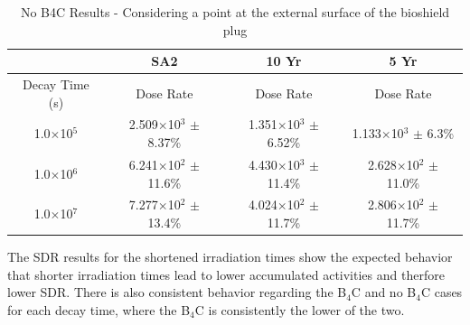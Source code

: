 \documentclass[12pt]{article}
\begin{document}
\begin{table}[ht!]
   \centering      
   \begin{tabular}{| c | c | c | c |}
      \hline
      & SA2 & 10 Yr & 5 Yr \\
      \hline
      Decay Time (s) & Dose Rate & Dose Rate & Dose Rate \\
      \hline
      1.0$\times$10$^{5}$ & 2.509$\times$10$^{3}$ $\pm$ 8.37\% & 1.351$\times$10$^{3}$ $\pm$ 6.52\% & 1.133$\times$10$^{3}$ $\pm$ 6.3\%\\
      1.0$\times$10$^{6}$ & 6.241$\times$10$^{2}$ $\pm$ 11.6\% & 4.430$\times$10$^{3}$ $\pm$ 11.4\% & 2.628$\times$10$^{2}$ $\pm$ 11.0\%\\
      1.0$\times$10$^{7}$ & 7.277$\times$10$^{2}$ $\pm$ 13.4\% & 4.024$\times$10$^{2}$ $\pm$ 11.7\% & 2.806$\times$10$^{2}$ $\pm$ 11.7\%\\
      \hline
\end{tabular}
\caption{No B4C Results - Considering a point at the external surface of the bioshield plug}
\label{tab:nob4c_summary_scenario}
\end{table}

The SDR results for the shortened irradiation times show the expected behavior 
that shorter irradiation times lead to lower accumulated activities and therfore
lower SDR.  There is also consistent behavior regarding the B$_4$C and no B$_4$C
cases for each decay time, where the B$_4$C is consistently the lower of the two.

\newpage


\newpage
\clearpage
\end{document}
